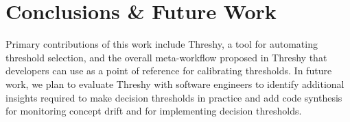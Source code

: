 \section{Conclusions \& Future Work}
\label{icse-demo2020:sec:conclusion}

Primary contributions of this work include Threshy, a tool for automating threshold selection, and the overall meta-workflow proposed in Threshy that developers can use as a point of reference for calibrating thresholds. In future work, we plan to evaluate Threshy with software engineers to identify additional insights required to make decision thresholds in practice and add code synthesis for monitoring concept drift and for implementing decision thresholds.